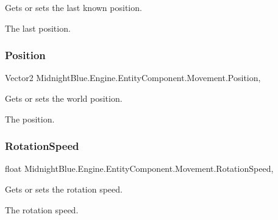 Gets or sets the last known position. 

The last position.\hypertarget{class_midnight_blue_1_1_engine_1_1_entity_component_1_1_movement_ab48a6634fc6983d0d36fe8c17654ee4b}{}\label{class_midnight_blue_1_1_engine_1_1_entity_component_1_1_movement_ab48a6634fc6983d0d36fe8c17654ee4b} 
\subsubsection{\texorpdfstring{Position}{Position}}
{\footnotesize\ttfamily Vector2 Midnight\+Blue.\+Engine.\+Entity\+Component.\+Movement.\+Position\hspace{0.3cm}{\ttfamily [get]}, {\ttfamily [set]}}



Gets or sets the world position. 

The position.\hypertarget{class_midnight_blue_1_1_engine_1_1_entity_component_1_1_movement_a7fd77249681b1f63114597ee712a2b16}{}\label{class_midnight_blue_1_1_engine_1_1_entity_component_1_1_movement_a7fd77249681b1f63114597ee712a2b16} 
\subsubsection{\texorpdfstring{Rotation\+Speed}{RotationSpeed}}
{\footnotesize\ttfamily float Midnight\+Blue.\+Engine.\+Entity\+Component.\+Movement.\+Rotation\+Speed\hspace{0.3cm}{\ttfamily [get]}, {\ttfamily [set]}}



Gets or sets the rotation speed. 

The rotation speed.\hypertarget{class_midnight_blue_1_1_engine_1_1_entity_component_1_1_movement_a6cbccdbe07f377faf4c4afa2f9821a76}{}\label{class_midnight_blue_1_1_engine_1_1_entity_component_1_1_movement_a6cbccdbe07f377faf4c4afa2f9821a76} 
